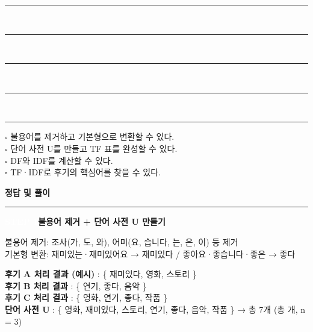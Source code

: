 \documentclass[a4paper,11pt]{article}
\newcommand{\essaybox}[1][5]{%
  \vspace{2mm}
  \noindent\rule{\linewidth}{0.3pt}\\[-2.5mm]
  \rule{\linewidth}{0.3pt}\\[-2.5mm]
  \rule{\linewidth}{0.3pt}\\[-2.5mm]
  \rule{\linewidth}{0.3pt}\\[-2.5mm]
  \rule{\linewidth}{0.3pt}
  \par\vspace{2mm}}
\begin{document}
\essaybox
\vspace{2mm}
\par\vspace{3mm}
\begin{tcolorbox}[colback=white,colframe=black!30,boxrule=0.4pt,left=5pt,right=5pt,top=3pt,bottom=3pt,title={\small 확인 체크리스트},coltitle=black,fonttitle=\bfseries\small]
\noindent $\square$ \small 불용어를 제거하고 기본형으로 변환할 수 있다.\\
\noindent $\square$ \small 단어 사전 U를 만들고 TF 표를 완성할 수 있다.\\
\noindent $\square$ \small DF와 IDF를 계산할 수 있다.\\
\noindent $\square$ \small TF·IDF로 후기의 핵심어를 찾을 수 있다.\\
\end{tcolorbox}
\newpage
\begin{center}
{\Large\bfseries 정답 및 풀이}
\end{center}
\noindent\rule{\linewidth}{0.8pt}
\vspace{3mm}
\noindent
\colorbox{badgegray}{\textcolor{white}{\small\bfseries STEP 1}}\enspace\textbf{불용어 제거 + 단어 사전 U 만들기}
\par\vspace{1mm}
\begin{tcolorbox}[colback=stepbg,colframe=gray!50,boxrule=0.3pt,left=5pt,right=5pt,top=2pt,bottom=2pt]
\noindent\small 불용어 제거: 조사(가, 도, 와), 어미(요, 습니다, 는, 은, 이) 등 제거\\
\noindent\small 기본형 변환: 재미있는·재미있어요 → 재미있다  /  좋아요·좋습니다·좋은 → 좋다\\
\end{tcolorbox}
\vspace{1mm}
\noindent\textbf{후기 A 처리 결과 (예시)} : \enspace
\colorbox{stepbg}{\{ 재미있다, 영화, 스토리 \}}
\\[3pt]
\noindent\textbf{후기 B 처리 결과} : \enspace
\colorbox{answerbg}{\{ 연기, 좋다, 음악 \}}
\\[3pt]
\noindent\textbf{후기 C 처리 결과} : \enspace
\colorbox{answerbg}{\{ 영화, 연기, 좋다, 작품 \}}
\\[3pt]
\noindent\textbf{단어 사전 U} : \enspace
\colorbox{answerbg}{\{ 영화, 재미있다, 스토리, 연기, 좋다, 음악, 작품 \}  →  총 7개}
\quad\small\color{gray}(총 \hspace{25mm} 개, n = 3)
\\[3pt]
\par\vspace{3mm}
\end{document}
